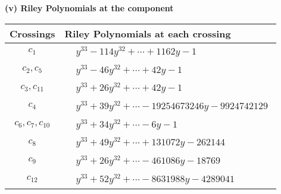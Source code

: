 \documentclass[1p]{elsarticle_modified}
\theoremstyle{definition}
\begin{document}
\newpage\renewcommand{\arraystretch}{1}
\flushleft \textbf{(v) Riley Polynomials at the component}\newline \\
\begin{tabular}{m{50pt}|m{274pt}}
Crossings & \hspace{64pt}Riley Polynomials at each crossing \\
\hline $$\begin{aligned}c_{1}\end{aligned}$$&$\begin{aligned}
&y^{33}-114 y^{32}+\cdots+1162 y-1
\end{aligned}$\\
\hline $$\begin{aligned}c_{2},c_{5}\end{aligned}$$&$\begin{aligned}
&y^{33}-46 y^{32}+\cdots+42 y-1
\end{aligned}$\\
\hline $$\begin{aligned}c_{3},c_{11}\end{aligned}$$&$\begin{aligned}
&y^{33}+26 y^{32}+\cdots+42 y-1
\end{aligned}$\\
\hline $$\begin{aligned}c_{4}\end{aligned}$$&$\begin{aligned}
&y^{33}+39 y^{32}+\cdots-19254673246 y-9924742129
\end{aligned}$\\
\hline $$\begin{aligned}c_{6},c_{7},c_{10}\end{aligned}$$&$\begin{aligned}
&y^{33}+34 y^{32}+\cdots-6 y-1
\end{aligned}$\\
\hline $$\begin{aligned}c_{8}\end{aligned}$$&$\begin{aligned}
&y^{33}+49 y^{32}+\cdots+131072 y-262144
\end{aligned}$\\
\hline $$\begin{aligned}c_{9}\end{aligned}$$&$\begin{aligned}
&y^{33}+26 y^{32}+\cdots-461086 y-18769
\end{aligned}$\\
\hline $$\begin{aligned}c_{12}\end{aligned}$$&$\begin{aligned}
&y^{33}+52 y^{32}+\cdots-8631988 y-4289041
\end{aligned}$\\
\hline
\end{tabular}\\~\\
\end{document}
